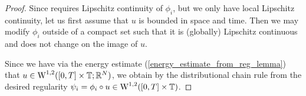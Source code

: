 \begin{proof}
	Since  requires Lipschitz continuity of $ \phi_{ i } $, but we only have local Lipschitz continuity, let us first assume that $ u $ is bounded in space and time. Then we may modify $ \phi_{ i } $ outside of a compact set such that it is (globally) Lipschitz continuous and does not change on the image of $ u $.
	
	Since we have via the energy estimate 
	(\ref{energy_estimate_from_reg_lemma}) that $ u \in \operatorname{W}^{ 1 , 2 } ( [ 0 , 
	T 
	] \times \operatorname{\mathbb{T}} ; \mathbb{ R }^{ N } ) $, we obtain by the 
	distributional chain rule from
	the desired regularity $ \psi_{ i } = \phi_{ i } \circ u \in \operatorname{W}^{ 1 , 2 } 
	( [ 0, 
	T ] \times 
	\operatorname{\mathbb{T}} ) $.
	

\end{proof}
